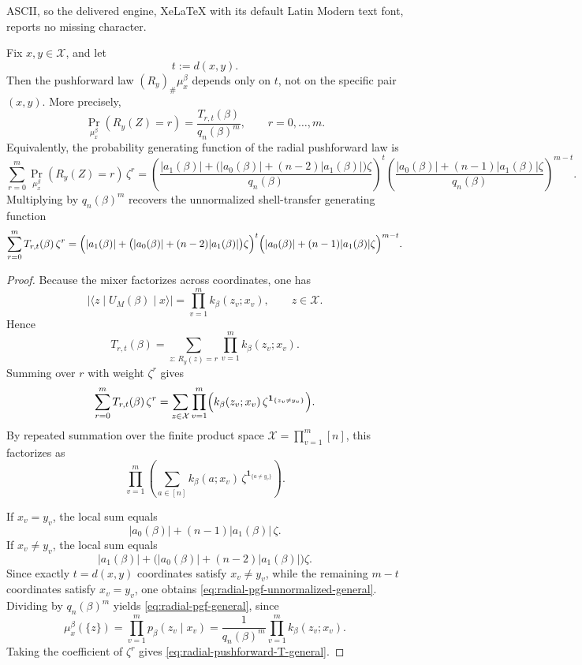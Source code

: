 \documentclass[10pt,a4paper]{amsart}
\begin{document}
ASCII, so the delivered engine, XeLaTeX with its default Latin Modern text font, reports no missing character.
\begin{proposition}
\label{prop:shell-transfer-product-pushforward}
Fix \(x,y\in \mathcal X\), and let
\[
t:=d(x,y).
\]
Then the pushforward law \((R_y)_\#\mu_x^\beta\) depends only on \(t\), not on
the specific pair \((x,y)\). More precisely,
\begin{equation}
\label{eq:radial-pushforward-T-general}
\Pr_{\mu_x^\beta}(R_y(Z)=r)
=
\frac{T_{r,t}(\beta)}{q_n(\beta)^m},
\qquad r=0,\dots,m.
\end{equation}
Equivalently, the probability generating function of the radial pushforward law is
\begin{equation}
\label{eq:radial-pgf-general}
\sum_{r=0}^{m}
\Pr_{\mu_x^\beta}(R_y(Z)=r)\,\zeta^r
=
\left(
\frac{|a_1(\beta)|+\bigl(|a_0(\beta)|+(n-2)|a_1(\beta)|\bigr)\zeta}
     {q_n(\beta)}
\right)^t
\left(
\frac{|a_0(\beta)|+(n-1)|a_1(\beta)|\zeta}
     {q_n(\beta)}
\right)^{m-t}.
\end{equation}
Multiplying by \(q_n(\beta)^m\) recovers the unnormalized shell-transfer
generating function
\begin{equation}
\label{eq:radial-pgf-unnormalized-general}
\sum_{r=0}^{m} T_{r,t}(\beta)\,\zeta^r
=
\Bigl(|a_1(\beta)| + \bigl(|a_0(\beta)|+(n-2)|a_1(\beta)|\bigr)\zeta\Bigr)^t
\Bigl(|a_0(\beta)| + (n-1)|a_1(\beta)|\zeta\Bigr)^{m-t}.
\end{equation}
\end{proposition}

\begin{proof}
Because the mixer factorizes across coordinates, one has
\[
\bigl|\langle z\mid U_M(\beta)\mid x\rangle\bigr|
=
\prod_{v=1}^{m} k_\beta(z_v;x_v),
\qquad z\in \mathcal X.
\]
Hence
\[
T_{r,t}(\beta)
=
\sum_{z:\,R_y(z)=r}\prod_{v=1}^{m} k_\beta(z_v;x_v).
\]
Summing over \(r\) with weight \(\zeta^r\) gives
\[
\sum_{r=0}^{m} T_{r,t}(\beta)\,\zeta^r
=
\sum_{z\in \mathcal X}
\prod_{v=1}^{m}
\Bigl(
k_\beta(z_v;x_v)\,\zeta^{\mathbf 1_{\{z_v\neq y_v\}}}
\Bigr).
\]
By repeated summation over the finite product space \(\mathcal X=\prod_{v=1}^{m}[n]\),
this factorizes as
\[
\prod_{v=1}^{m}
\left(
\sum_{a\in[n]} k_\beta(a;x_v)\,\zeta^{\mathbf 1_{\{a\neq y_v\}}}
\right).
\]

If \(x_v=y_v\), the local sum equals
\[
|a_0(\beta)|+(n-1)|a_1(\beta)|\,\zeta.
\]
If \(x_v\neq y_v\), the local sum equals
\[
|a_1(\beta)|
+
\bigl(|a_0(\beta)|+(n-2)|a_1(\beta)|\bigr)\zeta.
\]
Since exactly \(t=d(x,y)\) coordinates satisfy \(x_v\neq y_v\), while the
remaining \(m-t\) coordinates satisfy \(x_v=y_v\), one obtains
\eqref{eq:radial-pgf-unnormalized-general}. Dividing by \(q_n(\beta)^m\) yields
\eqref{eq:radial-pgf-general}, since
\[
\mu_x^\beta(\{z\})
=
\prod_{v=1}^{m} p_\beta(z_v\mid x_v)
=
\frac{1}{q_n(\beta)^m}
\prod_{v=1}^{m} k_\beta(z_v;x_v).
\]
Taking the coefficient of \(\zeta^r\) gives
\eqref{eq:radial-pushforward-T-general}.
\end{proof}
\end{document}
